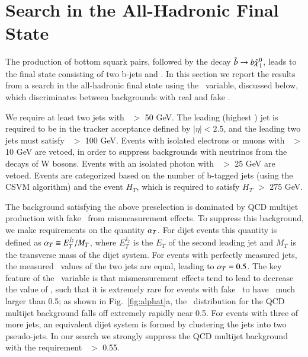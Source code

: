\section{Search in the All-Hadronic Final State}
\label{sec:alphat}

The production of bottom squark pairs, followed by the decay $\tilde{b}\to b\tilde{\chi}_{1}^{0}$, leads to the final state consisting
of two b-jets and \met. In this section we report the results from a search in the all-hadronic final state using the 
\alphat\ variable, discussed below, which discriminates between backgrounds with real and fake \met.

We require at least two jets with \pt\ $>$ 50 GeV. The leading (highest \pt) jet is required to be in the tracker acceptance defined by
$|\eta|<2.5$, and the leading two jets must satisfy \pt\ $>$ 100 GeV. Events with isolated electrons or muons with \pt\ $>$ 10 GeV
are vetoed, in order to suppress backgrounds with neutrinos from the decays of W bosons. Events with an isolated photon with \pt\ $>$ 25 GeV are vetoed.
Events are categorized based on the number of b-tagged jets (using the CSVM algorithm) and the event $H_T$, which is required to satisfy $H_T$ $>$ 275 GeV.

The background satisfying the above preselection is dominated by QCD multijet production with fake \met\ from mismeasurement effects. To suppress this background,
we make requirements on the quantity $\alpha_{T}$. For dijet events this quantity is defined as $\alpha_{T} \equiv E_{T}^{j_2} / M_{T}$, where $E_{T}^{j_2}$ is the $E_T$
of the second leading jet and $M_T$ is the transverse mass of the dijet system. 
For events with perfectly measured jets, the measured \pt\ values of the two jets are equal, leading to $\alpha_{T}=0.5$. The key feature of the \alphat\ variable
is that mismeasurement effects tend to lead to decrease the value of \alphat, such that it is extremely rare for events with fake \met\ to have \alphat\
much larger than 0.5; as shown in Fig.~\ref{fig:alphat}a, the \alphat\ distribution for the QCD multijet background falls off extremely rapidly near 0.5.
For events with three of more jets, an equivalent dijet system is formed by  clustering the jets into two pseudo-jets. In our search we strongly suppress the
QCD multijet background with the requirement \alphat\ $>$ 0.55.

